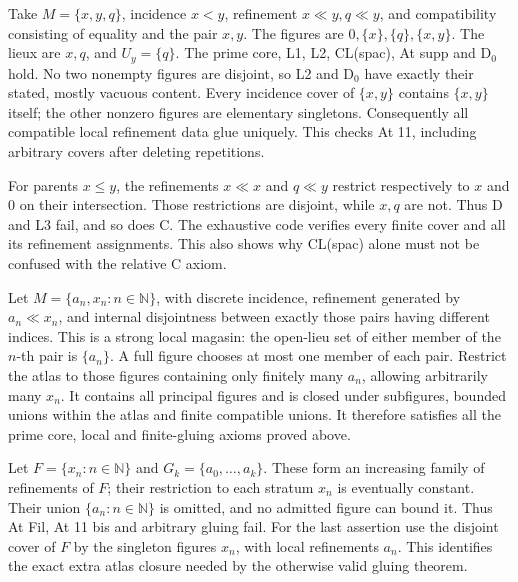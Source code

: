 \begin{counterexample}
\label{SA21-B-gluing-not-L3}
Take \(M=\{x,y,q\}\), incidence \(x<y\), refinement
\(x\ll y,q\ll y\), and compatibility consisting of equality and
the pair \(x,y\). The figures are
\(0,\{x\},\{q\},\{x,y\}\). The lieux are \(x,q\), and
\(U_y=\{q\}\). The prime core, L1, L2, CL(spac), At supp and
D\(_0\) hold. No two nonempty figures are disjoint, so L2 and
D\(_0\) have exactly their stated, mostly vacuous content.
Every incidence cover of \(\{x,y\}\) contains \(\{x,y\}\) itself;
the other nonzero figures are elementary singletons. Consequently
all compatible local refinement data glue uniquely. This checks
At 11, including arbitrary covers after deleting repetitions.

For parents \(x\leq y\), the refinements \(x\ll x\) and \(q\ll y\)
restrict respectively to \(x\) and \(0\) on their intersection.
Those restrictions are disjoint, while \(x,q\) are not. Thus D
and L3 fail, and so does C. The exhaustive code verifies every
finite cover and all its refinement assignments. This also shows
why CL(spac) alone must not be confused with the relative C axiom.
\end{counterexample}

\begin{counterexample}
\label{SA21-B-fil}
Let \(M=\{a_n,x_n:n\in\mathbb N\}\), with discrete incidence,
refinement generated by \(a_n\ll x_n\), and internal disjointness
between exactly those pairs having different indices. This is a
strong local magasin: the open-lieu set of either member of the
\(n\)-th pair is \(\{a_n\}\). A full figure chooses at most one
member of each pair. Restrict the atlas to those figures containing
only finitely many \(a_n\), allowing arbitrarily many \(x_n\).
It contains all principal figures and is closed under subfigures,
bounded unions within the atlas and finite compatible unions.
It therefore satisfies all the prime core, local and finite-gluing
axioms proved above.

Let \(F=\{x_n:n\in\mathbb N\}\) and
\(G_k=\{a_0,\ldots,a_k\}\). These form an increasing family of
refinements of \(F\); their restriction to each stratum \(x_n\)
is eventually constant. Their union \(\{a_n:n\in\mathbb N\}\)
is omitted, and no admitted figure can bound it. Thus At Fil,
At 11 bis and arbitrary gluing fail. For the last assertion use the
disjoint cover of \(F\) by the singleton figures \(x_n\), with local
refinements \(a_n\). This identifies the exact extra atlas closure
needed by the otherwise valid gluing theorem.
\end{counterexample}

